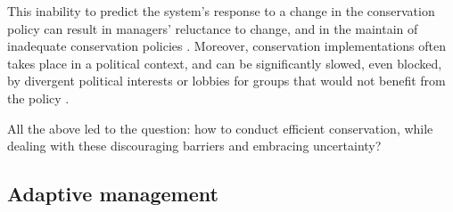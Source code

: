 \documentclass[12pt,a4paper]{article}
\begin{document}
This inability to predict the system's response to a change in the conservation policy can result in managers' reluctance to change, and in the maintain of inadequate conservation policies \citep{peterson2005conservation, keith2011uncertainty}.
Moreover, conservation implementations often takes place in a political context, and can be significantly slowed, even blocked, by divergent political interests or lobbies for groups that would not benefit from the policy \citep{keith2011uncertainty}.

All the above led to the question: how to conduct efficient conservation, while dealing with these discouraging barriers and embracing uncertainty?

\subsection{Adaptive management}
%
\end{document}

